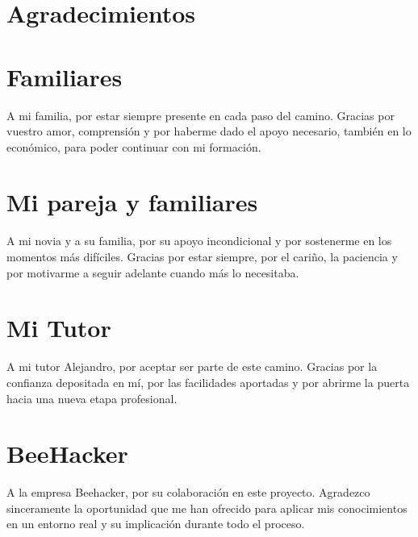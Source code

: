 \documentclass[a4paper, 10pt]{article}
\begin{document}
\section*{Agradecimientos}
\section*{Familiares}

\thispagestyle{empty}

\vfill
\begin{flushright}
\begin{minipage}{0.5\textwidth}
A mi familia, por estar siempre presente en cada paso del camino. Gracias por vuestro amor, comprensión y por haberme dado el apoyo necesario, también en lo económico, para poder continuar con mi formación.
\end{minipage}
\end{flushright}
\clearpage

\section*{Mi pareja y familiares}
\thispagestyle{empty}

\vfill
\begin{flushright}
\begin{minipage}{0.5\textwidth}
A mi novia y a su familia, por su apoyo incondicional y por sostenerme en los momentos más difíciles. Gracias por estar siempre, por el cariño, la paciencia y por motivarme a seguir adelante cuando más lo necesitaba.
\end{minipage}
\end{flushright}
\clearpage

\section*{Mi Tutor}
\thispagestyle{empty}

\vfill
\begin{flushright}
\begin{minipage}{0.5\textwidth}
A mi tutor Alejandro, por aceptar ser parte de este camino. Gracias por la confianza depositada en mí, por las facilidades aportadas y por abrirme la puerta hacia una nueva etapa profesional.
\end{minipage}
\end{flushright}
\clearpage

\section*{BeeHacker}
\thispagestyle{empty}
\vfill
\begin{flushright}
\begin{minipage}{0.5\textwidth}
A la empresa Beehacker, por su colaboración en este proyecto. Agradezco sinceramente la oportunidad que me han ofrecido para aplicar mis conocimientos en un entorno real y su implicación durante todo el proceso.
\end{minipage}
\end{flushright}
\clearpage
\end{document}
